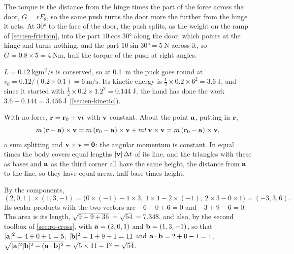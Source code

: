 \label{sec:ro-solutions}

The torque is the distance from the hinge times the
part of the force across the door, $G = rF_\theta$, so the same push turns
the door more the further from the hinge it acts. At \ang{30} to the face
of the door, the push splits, as the weight on the ramp of
\cref{sec:en-friction}, into the part $10\cos\ang{30}$ along the door,
which points at the hinge and turns nothing, and the part $10\sin\ang{30}
= \SI{5}{\newton}$ across it, so $G = 0.8\times5 = \SI{4}{\newton\metre}$,
half the torque of the push at right angles.

$L = \SI{0.12}{\kilogram\metre\squared\per\second}$
is conserved, so at \SI{0.1}{\metre} the puck goes round at $v_\theta =
0.12/(0.2\times0.1) = \SI{6}{\metre\per\second}$. Its kinetic energy is
$\frac12\times0.2\times6^2 = \SI{3.6}{\joule}$, and since it started with
$\frac12\times0.2\times1.2^2 = \SI{0.144}{\joule}$, the hand has done the
work $3.6 - 0.144 = \SI{3.456}{\joule}$ (\cref{sec:en-kinetic}).

With no force, $\bm{\mathrm{r}} = \bm{\mathrm{r}}_0 + \bm{\mathrm{v}}t$
with $\bm{\mathrm{v}}$ constant. About the point $\bm{\mathrm{a}}$, putting in $\bm{\mathrm{r}}$,
\begin{equation*}
   m\,(\bm{\mathrm{r}} - \bm{\mathrm{a}})\times\bm{\mathrm{v}}
   = m\,(\bm{\mathrm{r}}_0 - \bm{\mathrm{a}})\times\bm{\mathrm{v}} + mt\,\bm{\mathrm{v}}\times\bm{\mathrm{v}}
   = m\,(\bm{\mathrm{r}}_0 - \bm{\mathrm{a}})\times\bm{\mathrm{v}} ,
\end{equation*}
a sum splitting and $\bm{\mathrm{v}}\times\bm{\mathrm{v}} = \bm{\mathrm{0}}$: the angular momentum is
constant. In equal times the body covers equal lengths $\lvert\bm{\mathrm{v}}\rvert
\,\Delta t$ of its line, and the triangles with these as bases and $\bm{\mathrm{a}}$
as the third corner all have the same height, the distance from $\bm{\mathrm{a}}$ to
the line, so they have equal areas, half base times height.

By the components,
\begin{equation*}
   (2, 0, 1)\times(1, 3, -1) = \bigl(0\times(-1) - 1\times3,\
   1\times1 - 2\times(-1),\ 2\times3 - 0\times1\bigr) = (-3, 3, 6) .
\end{equation*}
Its scalar products with the two vectors are $-6 + 0 + 6 = 0$ and $-3 + 9 -
6 = 0$. The area is its length, $\sqrt{9 + 9 + 36} = \sqrt{54} = 7.348$, and
also, by the second toolbox of \cref{sec:ro-cross}, with $\bm{\mathrm{a}} = (2, 0,
1)$ and $\bm{\mathrm{b}} = (1, 3, -1)$, so that $\lvert\bm{\mathrm{a}}\rvert^2 = 4 + 0 + 1 =
5$, $\lvert\bm{\mathrm{b}}\rvert^2 = 1 + 9 + 1 = 11$ and $\bm{\mathrm{a}}\cdot\bm{\mathrm{b}} = 2 + 0
- 1 = 1$, $\sqrt{\lvert\bm{\mathrm{a}}\rvert^2\lvert\bm{\mathrm{b}}\rvert^2 - (\bm{\mathrm{a}}\cdot
\bm{\mathrm{b}})^2} = \sqrt{5\times11 - 1^2} = \sqrt{54}$.

